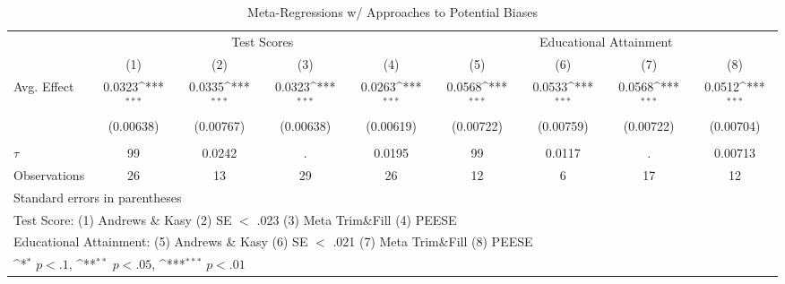 \begin{table}[htbp]\centering
\def\sym#1{\ifmmode^{#1}\else\(^{#1}\)\fi}
\caption{Meta-Regressions w/ Approaches to Potential Biases \label{tab:pubbiasregs}}
\begin{tabular}{l*{8}{c}}
\hline\hline
          &\multicolumn{4}{c}{Test Scores}                                            &\multicolumn{4}{c}{Educational Attainment}                                 \\\cmidrule(lr){2-5}\cmidrule(lr){6-9}
          &\multicolumn{1}{c}{(1)}         &\multicolumn{1}{c}{(2)}         &\multicolumn{1}{c}{(3)}         &\multicolumn{1}{c}{(4)}         &\multicolumn{1}{c}{(5)}         &\multicolumn{1}{c}{(6)}         &\multicolumn{1}{c}{(7)}         &\multicolumn{1}{c}{(8)}         \\
\hline
Avg. Effect&   0.0323\sym{***}&   0.0335\sym{***}&   0.0323\sym{***}&   0.0263\sym{***}&   0.0568\sym{***}&   0.0533\sym{***}&   0.0568\sym{***}&   0.0512\sym{***}\\
          &(0.00638)         &(0.00767)         &(0.00638)         &(0.00619)         &(0.00722)         &(0.00759)         &(0.00722)         &(0.00704)         \\
\hline
\hline    &                  &                  &                  &                  &                  &                  &                  &                  \\
$\tau$    &       99         &   0.0242         &        .         &   0.0195         &       99         &   0.0117         &        .         &  0.00713         \\
Observations&       26         &       13         &       29         &       26         &       12         &        6         &       17         &       12         \\
\hline\hline
\multicolumn{9}{l}{\footnotesize Standard errors in parentheses}\\
\multicolumn{9}{l}{\footnotesize Test Score: (1) Andrews \& Kasy (2) SE $<$ .023 (3) Meta Trim\&Fill (4) PEESE}\\
\multicolumn{9}{l}{\footnotesize Educational Attainment: (5) Andrews \& Kasy (6) SE $<$ .021 (7) Meta Trim\&Fill (8) PEESE}\\
\multicolumn{9}{l}{\footnotesize \sym{*} \(p<.1\), \sym{**} \(p<.05\), \sym{***} \(p<.01\)}\\
\end{tabular}
\end{table}

